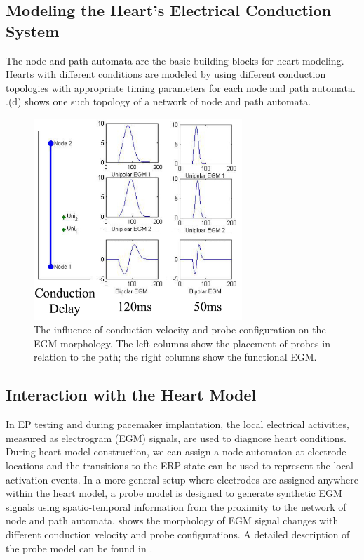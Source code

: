 \subsection{Modeling the Heart's Electrical Conduction System}
The node and path automata are the basic building blocks for heart modeling. Hearts with different conditions are modeled by using different conduction topologies with appropriate timing parameters for each node and path automata. .(d) shows one such  topology of a network of node and path automata.
\begin{figure}[!t]
\center
		\includegraphics[width=0.7\textwidth]{figs/fig7.png}
\caption{The influence of conduction velocity and probe configuration on the EGM morphology. The left columns show the placement of probes in relation to the path; the right columns show the functional EGM.}
\label{fig:egm_s}
\end{figure}
\subsection{Interaction with the Heart Model}
In EP testing and during pacemaker implantation, the local electrical activities, measured as electrogram (EGM) signals, are used to diagnose heart conditions. During heart model construction, we can assign a node automaton at electrode locations and the transitions to the ERP state can be used to represent the local activation events. In a more general setup where electrodes are assigned anywhere within the heart model, a probe model is designed to generate synthetic EGM signals using spatio-temporal information from the proximity to the network of node and path automata.  shows the morphology of EGM signal changes with different conduction velocity and probe configurations. A detailed description of the probe model can be found in \cite{vhm_embc11}.

